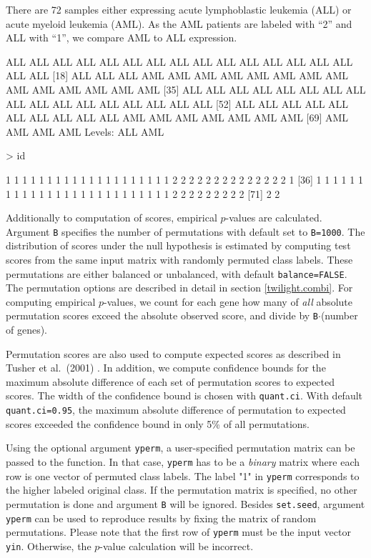 \documentclass[11pt,a4paper,fleqn]{report}
\newcommand{\Rfunction}[1]{{\texttt{#1}}}
\newcommand{\Rfunarg}[1]{{\texttt{#1}}}
\begin{document}
There are 72 samples either expressing acute lymphoblastic leukemia (ALL) or acute myeloid leukemia (AML). As the AML patients are labeled with ``2'' and ALL with ``1'', we compare AML to ALL expression.
\begin{Schunk}
\begin{Soutput}
 [1] ALL ALL ALL ALL ALL ALL ALL ALL ALL ALL ALL ALL ALL ALL ALL ALL ALL
[18] ALL ALL ALL AML AML AML AML AML AML AML AML AML AML AML AML AML AML
[35] ALL ALL ALL ALL ALL ALL ALL ALL ALL ALL ALL ALL ALL ALL ALL ALL ALL
[52] ALL ALL ALL ALL ALL ALL ALL ALL ALL ALL AML AML AML AML AML AML AML
[69] AML AML AML AML
Levels: ALL AML
\end{Soutput}
\begin{Sinput}
> id
\end{Sinput}
\begin{Soutput}
 [1] 1 1 1 1 1 1 1 1 1 1 1 1 1 1 1 1 1 1 1 1 2 2 2 2 2 2 2 2 2 2 2 2 2 2 1
[36] 1 1 1 1 1 1 1 1 1 1 1 1 1 1 1 1 1 1 1 1 1 1 1 1 1 1 2 2 2 2 2 2 2 2 2
[71] 2 2
\end{Soutput}
\end{Schunk}

Additionally to computation of scores, empirical $p$-values are calculated. Argument \Rfunarg{B} specifies the number of permutations with default set to \Rfunarg{B=1000}. The distribution of scores under the null hypothesis is estimated by computing test scores from the same input matrix with randomly permuted class labels. These permutations are either balanced or unbalanced, with default \Rfunarg{balance=FALSE}. The permutation options are described in detail in section \ref{twilight.combi}. For computing empirical $p$-values, we count for each gene how many of \textit{all} absolute permutation scores exceed the absolute observed score, and divide by \Rfunarg{B}$\cdot$(number of genes).

Permutation scores are also used to compute expected scores as described in Tusher et al.~(2001) \cite{tusher01}. In addition, we compute confidence bounds for the maximum absolute difference of each set of permutation scores to expected scores. The width of the confidence bound is chosen with \Rfunarg{quant.ci}. With default \Rfunarg{quant.ci=0.95}, the maximum absolute difference of permutation to expected scores exceeded the confidence bound in only 5\% of all permutations.

Using the optional argument \Rfunarg{yperm}, a user-specified permutation matrix can be passed to the function. In that case, \Rfunarg{yperm} has to be a \textit{binary} matrix where each row is one vector of permuted class labels. The label "1" in \Rfunarg{yperm} corresponds to the higher labeled original class. If the permutation matrix is specified, no other permutation is done and argument \Rfunarg{B} will be ignored. Besides \Rfunction{set.seed}, argument \Rfunarg{yperm} can be used to reproduce results by fixing the matrix of random permutations. Please note that the first row of \Rfunarg{yperm} must be the input vector \Rfunarg{yin}. Otherwise, the $p$-value calculation will be incorrect.
\end{document}

